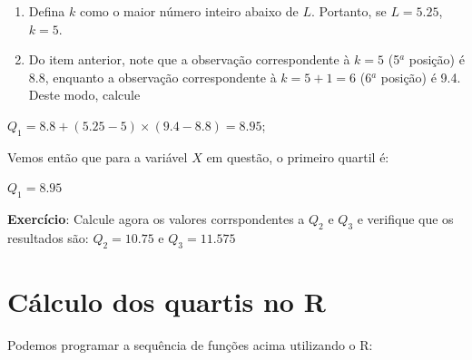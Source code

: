 \documentclass[
]{book}
\begin{document}
\begin{enumerate}
\def\labelenumi{\arabic{enumi}.}
\setcounter{enumi}{2}
\item
  Defina \(k\) como o maior número inteiro abaixo de \(L\). Portanto, se \(L = 5.25\), \(k = 5\).
\item
  Do item anterior, note que a observação correspondente à \(k = 5\) (5\(^a\) posição) é 8.8, enquanto a observação correspondente à \(k = 5 + 1 = 6\) (6\(^a\) posição) é 9.4. Deste modo, calcule
\end{enumerate}

\(Q_1 = 8.8 + (5.25 - 5) \times (9.4-8.8) = 8.95\);

Vemos então que para a variável \(X\) em questão, o primeiro quartil é:

\(Q_1 = 8.95\)

\textbf{Exercício}: Calcule agora os valores corrspondentes a \(Q_2\) e \(Q_3\) e verifique que os resultados são: \(Q_2 = 10.75\) e \(Q_3 = 11.575\)

\hypertarget{cuxe1lculo-dos-quartis-no-r}{%
\section{Cálculo dos quartis no R}\label{cuxe1lculo-dos-quartis-no-r}}

Podemos programar a sequência de funções acima utilizando o R:
\end{document}
